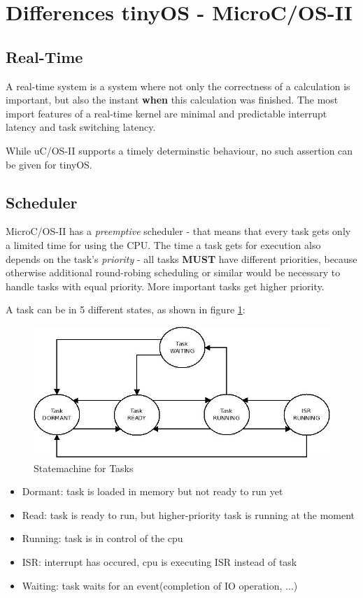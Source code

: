 \section{Differences tinyOS - MicroC/OS-II}

\subsection{Real-Time}

A real-time system is a system where not only the correctness of a calculation is important, but also the instant \textbf{when} this calculation was finished. The most import features of a real-time kernel are minimal and predictable interrupt latency and task switching latency.

While uC/OS-II supports a timely determinstic behaviour, no such assertion can be given for tinyOS.

\subsection{Scheduler}

MicroC/OS-II has a \textit{preemptive} scheduler - that means that every task gets only a limited time for using the CPU. The time a task gets for execution also depends on the task's \textit{priority} - all tasks \textbf{MUST} have different priorities, because otherwise additional round-robing scheduling or similar would be necessary to handle tasks with equal priority. More important tasks get higher priority.

A task can be in 5 different states, as shown in figure \ref{fig:tasksstates}:

\begin{figure}[h]
 \centerline{\includegraphics[width=.8\columnwidth]{pics/uCtasks.png}}
  \caption{Statemachine for Tasks}
  \label{fig:tasksstates}
\end{figure}

\begin{itemize}
 \item Dormant: task is loaded in memory but not ready to run yet
 \item Read: task is ready to run, but higher-priority task is running at the moment 
 \item Running: task is in control of the cpu
 \item ISR: interrupt has occured, cpu is executing ISR instead of task
 \item Waiting: task waits for an event(completion of IO operation, ...)
\end{itemize}

